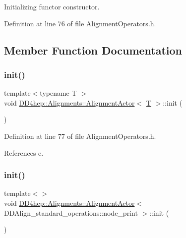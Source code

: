 Initializing functor constructor. 



Definition at line 76 of file Alignment\+Operators.\+h.



\subsection{Member Function Documentation}
\hypertarget{class_d_d4hep_1_1_alignments_1_1_alignment_actor_a594062a18b6bedd5dfb66abd663bf42e}{}\label{class_d_d4hep_1_1_alignments_1_1_alignment_actor_a594062a18b6bedd5dfb66abd663bf42e} 
\subsubsection{\texorpdfstring{init()}{init()}\hspace{0.1cm}{\footnotesize\ttfamily [1/2]}}
{\footnotesize\ttfamily template$<$typename T $>$ \\
void \hyperlink{class_d_d4hep_1_1_alignments_1_1_alignment_actor}{D\+D4hep\+::\+Alignments\+::\+Alignment\+Actor}$<$ \hyperlink{class_t}{T} $>$\+::init (\begin{DoxyParamCaption}{ }\end{DoxyParamCaption})\hspace{0.3cm}{\ttfamily [inline]}}



Definition at line 77 of file Alignment\+Operators.\+h.



References e.

\hypertarget{class_d_d4hep_1_1_alignments_1_1_alignment_actor_a135e3ccc01f7f5214327dbdf9c568d2a}{}\label{class_d_d4hep_1_1_alignments_1_1_alignment_actor_a135e3ccc01f7f5214327dbdf9c568d2a} 
\subsubsection{\texorpdfstring{init()}{init()}\hspace{0.1cm}{\footnotesize\ttfamily [2/2]}}
{\footnotesize\ttfamily template$<$$>$ \\
void \hyperlink{class_d_d4hep_1_1_alignments_1_1_alignment_actor}{D\+D4hep\+::\+Alignments\+::\+Alignment\+Actor}$<$ D\+D\+Align\+\_\+standard\+\_\+operations\+::node\+\_\+print $>$\+::init (\begin{DoxyParamCaption}{ }\end{DoxyParamCaption})}

